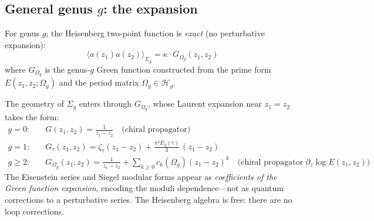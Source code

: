 \subsection{\texorpdfstring{General genus $g$: the expansion}{General genus g: the expansion}}
\label{subsec:heisenberg-general-genus}

\begin{theorem}\label{thm:heisenberg-all-genus}
For genus $g$, the Heisenberg two-point function is \emph{exact} (no perturbative expansion):
\begin{equation}
\langle a(z_1) a(z_2) \rangle_{\Sigma_g} = \kappa \cdot G_{\Omega_g}(z_1, z_2)
\end{equation}
where $G_{\Omega_g}$ is the genus-$g$ Green function constructed from the prime form $E(z_1, z_2; \Omega_g)$ and the period matrix $\Omega_g \in \mathcal{H}_g$.

The geometry of $\Sigma_g$ enters through $G_{\Omega_g}$, whose Laurent expansion near $z_1 = z_2$ takes the form:
\begin{align}
g=0: \quad & G(z_1, z_2) = \frac{1}{z_1 - z_2} \quad \text{(chiral propagator)} \\
g=1: \quad & G_\tau(z_1, z_2) = \zeta_\tau(z_1-z_2) + \frac{\pi^2 E_2(\tau)}{3}\,(z_1-z_2) \\
g \geq 2: \quad & G_{\Omega_g}(z_1, z_2) = \frac{1}{z_1-z_2} + \sum_{k \geq 0} c_k(\Omega_g)(z_1-z_2)^k \quad \text{(chiral propagator $\partial_z \log E(z_1,z_2)$)}
\end{align}
The Eisenstein series and Siegel modular forms appear as \emph{coefficients of the Green function expansion}, encoding the moduli dependence---not as quantum corrections to a perturbative series. The Heisenberg algebra is free: there are no loop corrections.
\end{theorem}

